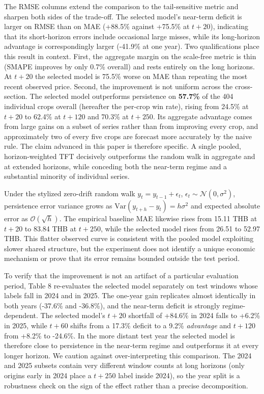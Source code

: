 \documentclass[review,3p,times]{elsarticle}
\begin{document}
The RMSE columns extend the comparison to the tail-sensitive metric and sharpen both sides of the trade-off. The selected model's near-term deficit is larger on RMSE than on MAE (+88.5\% against +75.5\% at $t+20$), indicating that its short-horizon errors include occasional large misses, while its long-horizon advantage is correspondingly larger (-41.9\% at one year). Two qualifications place this result in context. First, the aggregate margin on the scale-free metric is thin (SMAPE improves by only 0.7\% overall) and rests entirely on the long horizons. At $t+20$ the selected model is 75.5\% worse on MAE than repeating the most recent observed price. Second, the improvement is not uniform across the cross-section. The selected model outperforms persistence on \textbf{57.7\%} of the 404 individual crops overall (hereafter the per-crop win rate), rising from 24.5\% at $t+20$ to 62.4\% at $t+120$ and 70.3\% at $t+250$. Its aggregate advantage comes from large gains on a subset of series rather than from improving every crop, and approximately two of every five crops are forecast more accurately by the naive rule. The claim advanced in this paper is therefore specific. A single pooled, horizon-weighted TFT decisively outperforms the random walk in aggregate and at extended horizons, while conceding both the near-term regime and a substantial minority of individual series.

Under the stylized zero-drift random walk $y_t=y_{t-1}+\epsilon_t$, $\epsilon_t\sim\mathcal{N}(0,\sigma^2)$, persistence error variance grows as $\text{Var}(y_{t+h}-y_t)=h\sigma^2$ and expected absolute error as $\mathcal{O}(\sqrt{h})$. The empirical baseline MAE likewise rises from 15.11 THB at $t+20$ to 83.84 THB at $t+250$, while the selected model rises from 26.51 to 52.97 THB. This flatter observed curve is consistent with the pooled model exploiting slower shared structure, but the experiment does not identify a unique economic mechanism or prove that its error remains bounded outside the test period.

To verify that the improvement is not an artifact of a particular evaluation period, Table 8 re-evaluates the selected model separately on test windows whose labels fall in 2024 and in 2025. The one-year gain replicates almost identically in both years (-37.6\% and -36.8\%), and the near-term deficit is strongly regime-dependent. The selected model's $t+20$ shortfall of +84.6\% in 2024 falls to +6.2\% in 2025, while $t+60$ shifts from a 17.3\% deficit to a 9.2\% \emph{advantage} and $t+120$ from +8.2\% to -24.6\%. In the more distant test year the selected model is therefore close to persistence in the near-term regime and outperforms it at every longer horizon. We caution against over-interpreting this comparison. The 2024 and 2025 subsets contain very different window counts at long horizons (only origins early in 2024 place a $t+250$ label inside 2024), so the year split is a robustness check on the sign of the effect rather than a precise decomposition.
\end{document}
